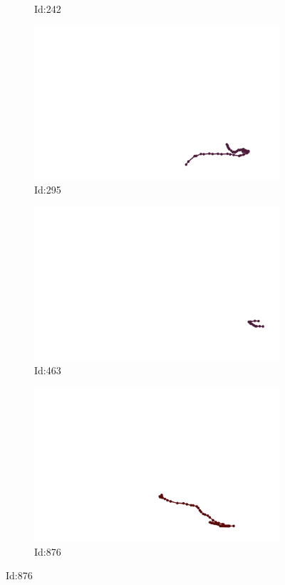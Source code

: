 \documentclass[12pt,twoside]{report}
\begin{document}
\begin{figure}
\begin{subfigure}[b]{0.20\textwidth}
\caption{Id:242}
\end{subfigure}
\begin{subfigure}[b]{0.20\textwidth}
\centering
\includegraphics[width=\textwidth]{../../trajectories/295.png}
\caption{Id:295}
\end{subfigure}
\begin{subfigure}[b]{0.20\textwidth}
\centering
\includegraphics[width=\textwidth]{../../trajectories/463.png}
\caption{Id:463}
\end{subfigure}
\begin{subfigure}[b]{0.20\textwidth}
\centering
\includegraphics[width=\textwidth]{../../trajectories/876.png}
\caption{Id:876}
\end{subfigure}
\end{figure}
\end{document}

